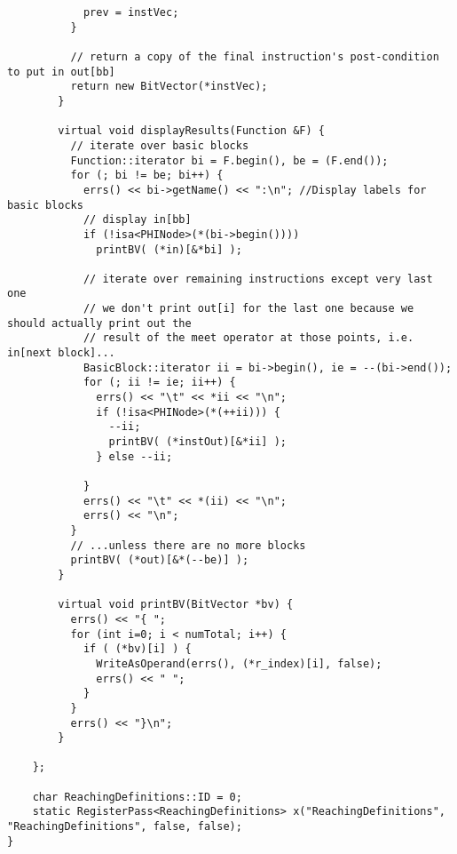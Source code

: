 \documentclass[12pt]{article}
\begin{document}
\begin{verbatim}
            prev = instVec;
          }
          
          // return a copy of the final instruction's post-condition to put in out[bb]
          return new BitVector(*instVec);
        }
        
        virtual void displayResults(Function &F) {
          // iterate over basic blocks
          Function::iterator bi = F.begin(), be = (F.end());
          for (; bi != be; bi++) {
            errs() << bi->getName() << ":\n"; //Display labels for basic blocks
            // display in[bb]
            if (!isa<PHINode>(*(bi->begin())))
              printBV( (*in)[&*bi] );
            
            // iterate over remaining instructions except very last one
            // we don't print out[i] for the last one because we should actually print out the
            // result of the meet operator at those points, i.e. in[next block]...              
            BasicBlock::iterator ii = bi->begin(), ie = --(bi->end());
            for (; ii != ie; ii++) {
              errs() << "\t" << *ii << "\n";
              if (!isa<PHINode>(*(++ii))) {
                --ii;
                printBV( (*instOut)[&*ii] );
              } else --ii;
              
            }
            errs() << "\t" << *(ii) << "\n";
            errs() << "\n";
          }
          // ...unless there are no more blocks
          printBV( (*out)[&*(--be)] );
        }
        
        virtual void printBV(BitVector *bv) {
          errs() << "{ ";
          for (int i=0; i < numTotal; i++) {
            if ( (*bv)[i] ) {
              WriteAsOperand(errs(), (*r_index)[i], false);
              errs() << " ";
            }
          }
          errs() << "}\n";
        }
    
    };

    char ReachingDefinitions::ID = 0;
    static RegisterPass<ReachingDefinitions> x("ReachingDefinitions", "ReachingDefinitions", false, false);
}

\end{verbatim}
\end{document}
